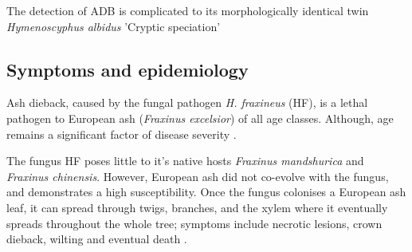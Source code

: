 The detection of ADB is complicated to its morphologically identical twin \textit{Hymenoscyphus albidus} \cite{queloz2011cryptic} 'Cryptic speciation'

\subsection{Symptoms and epidemiology}

Ash dieback, caused by the fungal pathogen \textit{H. fraxineus} (HF), is a lethal pathogen to European ash (\textit{Fraxinus excelsior}) of all age classes. 
Although, age remains a significant factor of disease severity \cite{marccais2017estimation}.
 
The fungus HF poses little to it's native hosts \textit{Fraxinus mandshurica} and \textit{Fraxinus chinensis}.
However, European ash did not co-evolve with the fungus, and demonstrates a high susceptibility.
Once the fungus colonises a European ash leaf, it can spread through twigs, branches, and the xylem where it eventually spreads throughout the whole tree;
symptoms include necrotic lesions, crown dieback, wilting and eventual death \cite{gross2014h}.

